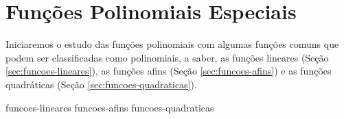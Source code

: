 \section{Funções Polinomiais Especiais}
\label{sec:funcoes-polinomiais-especiais}

Iniciaremos o estudo das funções polinomiais com algumas funções comuns que podem ser classificadas como
polinomiais, a saber, as funções lineares (Seção \ref{sec:funcoes-lineares}), 
as funções afins (Seção \ref{sec:funcoes-afins}) e as funções quadráticas 
(Seção \ref{sec:funcoes-quadraticas}).

{funcoes-lineares}
{funcoes-afins}
{funcoes-quadraticas}